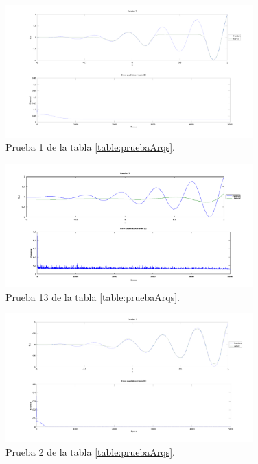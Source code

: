 \documentclass[11pt,a4paper]{article}
\begin{document}
{\begin{figure}[ht]
\centering
\includegraphics[width=0.85\textwidth]{img/PruebaRecu1.png}
\caption{\label{fig:pruebaRecu1} Prueba 1 de la tabla \ref{table:pruebaArqs}.}
\end{figure}

\begin{figure}[ht]
\centering
\includegraphics[width=0.85\textwidth]{img/unaCapa.png}
\caption{\label{fig:unaCapa} Prueba 13 de la tabla \ref{table:pruebaArqs}.}
\end{figure}

\begin{figure}[ht]
\centering
\includegraphics[width=0.85\textwidth]{img/PruebaRecu15.png}
\caption{\label{fig:pruebaRecu15} Prueba 2 de la tabla \ref{table:pruebaArqs}.}
\end{figure}

}
\end{document}
